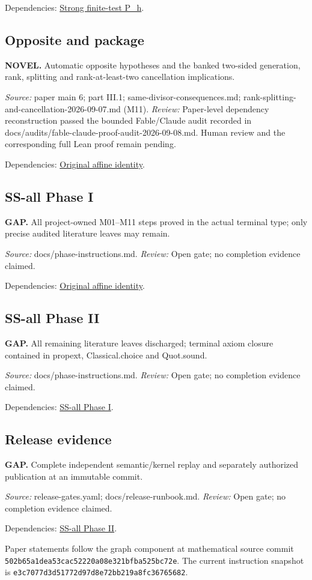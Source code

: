 Dependencies: \hyperlink{claim:induction}{Strong finite-test P\_h}.
\subsection{Opposite and package}\hypertarget{claim:package}{}\backmap
\textbf{NOVEL.} Automatic opposite hypotheses and the banked two-sided generation, rank, splitting and rank-at-least-two cancellation implications.

\emph{Source:} paper main 6; part III.1; same-divisor-consequences.md; rank-splitting-and-cancellation-2026-09-07.md (M11).
\emph{Review:} Paper-level dependency reconstruction passed the bounded Fable/Claude audit recorded in docs/audits/fable-claude-proof-audit-2026-09-08.md. Human review and the corresponding full Lean proof remain pending.

Dependencies: \hyperlink{claim:terminal}{Original affine identity}.
\subsection{SS-all Phase I}\hypertarget{claim:phasei}{}\backmap
\textbf{GAP.} All project-owned M01–M11 steps proved in the actual terminal type; only precise audited literature leaves may remain.

\emph{Source:} docs/phase-instructions.md.
\emph{Review:} Open gate; no completion evidence claimed.

Dependencies: \hyperlink{claim:terminal}{Original affine identity}.
\subsection{SS-all Phase II}\hypertarget{claim:phaseii}{}\backmap
\textbf{GAP.} All remaining literature leaves discharged; terminal axiom closure contained in propext, Classical.choice and Quot.sound.

\emph{Source:} docs/phase-instructions.md.
\emph{Review:} Open gate; no completion evidence claimed.

Dependencies: \hyperlink{claim:phasei}{SS-all Phase I}.
\subsection{Release evidence}\hypertarget{claim:publication}{}\backmap
\textbf{GAP.} Complete independent semantic/kernel replay and separately authorized publication at an immutable commit.

\emph{Source:} release-gates.yaml; docs/release-runbook.md.
\emph{Review:} Open gate; no completion evidence claimed.

Dependencies: \hyperlink{claim:phaseii}{SS-all Phase II}.

Paper statements follow the graph component at mathematical source commit
\nolinkurl{502b65a1dea53cac52220a08e321bfba525bc72e}.
The current instruction snapshot is
\nolinkurl{e3c7077d3d51772d97d8e72bb219a8fc36765682}.
